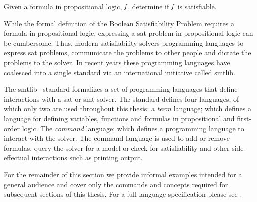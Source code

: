 \begin{definition}
  Given a formula in propositional logic, $\mathit{f}$, determine if $\mathit{f}$ is
  satisfiable.
\end{definition}

While the formal definition of the Boolean Satisfiability Problem requires a
formula in propositional logic, expressing a \ac{sat} problem in propositional
logic can be cumbersome. Thus, modern satisfiability solvers programming
languages to express \ac{sat} problems, communicate the problems to other people
and dictate the problems to the solver. In recent years these programming
languages have coalesced into a single standard via an international initiative
called \acl{smtlib}.

The \acl{smtlib}~\cite{BarFT-SMTLIB} standard formalizes a set of programming
languages that define interactions with a \ac{sat} or \ac{smt} solver. The
standard defines four languages, of which only two are used throughout this
thesis: a \emph{term} language; which defines a language for defining variables,
functions and formulas in propositional and first-order logic. The
\emph{command} language; which defines a programming language to interact with
the solver. The command language is used to add or remove formulas, query the
solver for a model or check for satisfiability and other side-effectual
interactions such as printing output.

For the remainder of this section we provide informal examples intended for a
general audience and cover only the commands and concepts required for
subsequent sections of this thesis. For a full language specification please see
\citet{BarFT-SMTLIB}.

